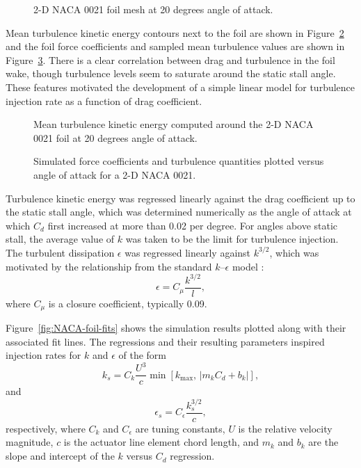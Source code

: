 \begin{figure}
    \centering
    
    \caption{2-D NACA 0021 foil mesh at 20 degrees angle of attack.}
    
    \label{fig:NACA-foil-mesh}
\end{figure}

Mean turbulence kinetic energy contours next to the foil are shown in
Figure~\ref{fig:NACA-foil-k} and the foil force coefficients and sampled mean
turbulence values are shown in Figure~\ref{fig:NACA-foil-coeffs}. There is a
clear correlation between drag and turbulence in the foil wake, though
turbulence levels seem to saturate around the static stall angle. These features
motivated the development of a simple linear model for turbulence injection rate
as a function of drag coefficient.

\begin{figure}
    \centering
    
    \caption{Mean turbulence kinetic energy computed around the 2-D NACA 0021
        foil at 20 degrees angle of attack.}
    
    \label{fig:NACA-foil-k}
\end{figure}

\begin{figure}
    \centering
    
    \caption{Simulated force coefficients and turbulence quantities plotted
        versus angle of attack for a 2-D NACA 0021.}
    
    \label{fig:NACA-foil-coeffs}
\end{figure}

Turbulence kinetic energy was regressed linearly against the drag coefficient up
to the static stall angle, which was determined numerically as the angle of
attack at which $C_d$ first increased at more than 0.02 per degree. For angles
above static stall, the average value of $k$ was taken to be the limit for
turbulence injection. The turbulent dissipation $\epsilon$ was regressed
linearly against $k^{3/2}$, which was motivated by the relationship from the
standard $k$--$\epsilon$ model \cite{Wilcox1994}:
\begin{equation}
    \epsilon = C_\mu \frac{k^{3/2}}{l},
\end{equation}
where $C_\mu$ is a closure coefficient, typically 0.09.

Figure~\ref{fig:NACA-foil-fits} shows the simulation results plotted along with
their associated fit lines. The regressions and their resulting parameters
inspired injection rates for $k$ and $\epsilon$ of the form
\begin{equation}
    k_s = C_k \frac{U^3}{c} \min \left[ k_{\max} ,\, | m_k C_d +
    b_k | \right],
\end{equation}
and
\begin{equation}
    \epsilon_s = C_\epsilon \frac{k_s^{3/2}}{c},
\end{equation}
respectively, where $C_k$ and $C_\epsilon$ are tuning constants, $U$ is the
relative velocity magnitude, $c$ is the actuator line element chord length, and
$m_k$ and $b_k$ are the slope and intercept of the $k$ versus $C_d$ regression.

